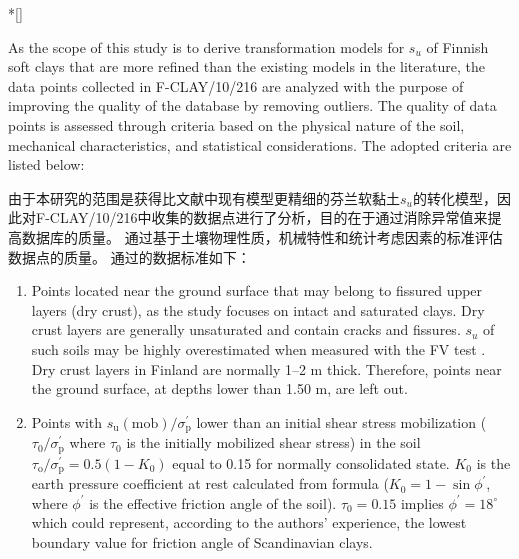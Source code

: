 \begin{ParaColumn}
    \switchcolumn[0]*[]

    As the scope of this study is to derive transformation models for $s_u$ of Finnish soft clays that are more refined than the existing models in the literature, the data points collected in F-CLAY/10/216 are analyzed with the purpose of improving the quality of the database by removing outliers. The quality of data points is assessed through criteria based on the physical nature of the soil, mechanical characteristics, and statistical considerations. The adopted criteria are listed below:

    \switchcolumn

    由于本研究的范围是获得比文献中现有模型更精细的芬兰软黏土$s_u$的转化模型，因此对F-CLAY/10/216中收集的数据点进行了分析，目的在于通过消除异常值来提高数据库的质量。 通过基于土壤物理性质，机械特性和统计考虑因素的标准评估数据点的质量。 通过的数据标准如下：

    \switchcolumn*

    \begin{enumerate}
        \item Points located near the ground surface that may belong to fissured upper layers (dry crust), as the study focuses on intact and saturated clays. Dry crust layers are generally unsaturated and contain cracks and fissures. $s_u$ of such soils may be highly overestimated when measured with the FV test \citep{LaRochelle1974142,Lefebvre198723,D'Ignazio20153639}. Dry crust layers in Finland are normally 1–2 m thick. Therefore, points near the ground surface, at depths lower than 1.50 m, are left out.\\
        
        \item Points with $s_{\mathrm{u}}(\mathrm{mob})/\sigma_{\mathrm{p}}^{\prime}$ lower than an initial shear stress mobilization ($\tau_{0}/\sigma_{\mathrm{p}}^{\prime}$ where $\tau_{0}$ is the initially mobilized shear stress) in the soil $\tau_{\mathrm{o}} / \sigma_{\mathrm{p}}^{\prime}=0.5\left(1-K_{0}\right)$ equal to 0.15 for normally consolidated state. $K_{0}$ is the earth pressure coefficient at rest calculated from \citet{Jaky1944355} formula ($K_{0}=1-\sin \phi^{\prime}$, where $\phi^{\prime}$ is the effective friction angle of the soil). $\tau_{0}=0.15$ implies $\phi^{\prime}=18^{\circ}$ which could represent, according to the authors' experience, the lowest boundary value for friction angle of Scandinavian clays.
        

\end{enumerate}
\end{ParaColumn}
